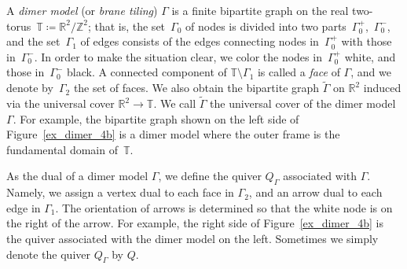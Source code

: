 \documentclass[11pt]{article}
\numberwithin{equation}{section}
\numberwithin{equation}{section}
\numberwithin{figure}{section}
\numberwithin{table}{section}
\newcommand{\ZZ}{\mathbb{Z}}
\newcommand{\RR}{\mathbb{R}}
\newcommand{\TT}{\mathbb{T}}
\begin{document}
A \emph{dimer model} (or \emph{brane tiling}) $\Gamma$ is a finite bipartite graph on the real two-torus~$\TT\coloneqq\RR^2/\ZZ^2$; that is, the set~$\Gamma_0$ of nodes is divided into two parts~$\Gamma_0^+$,~$\Gamma_0^-$, and the set~$\Gamma_1$ of edges consists of the edges connecting nodes in~$\Gamma_0^+$ with those in~$\Gamma_0^-$.
In order to make the situation clear, we color the nodes in~$\Gamma_0^+$ white, and those in~$\Gamma_0^-$ black.
A connected component of $\TT{\setminus}\Gamma_1$ is called a \emph{face} of $\Gamma$, and we denote by~$\Gamma_2$ the set of faces.
We also obtain the bipartite graph $\widetilde{\Gamma}$ on $\RR^2$ induced via the universal cover $\RR^2\rightarrow\TT$.
We call $\widetilde{\Gamma}$ the universal cover of the dimer model~$\Gamma$.
For example, the bipartite graph shown on the left side of Figure~\ref{ex_dimer_4b} is a dimer model
where the outer frame is the fundamental domain of~$\TT$.

As the dual of a dimer model $\Gamma$, we define the quiver $Q_\Gamma$ associated with $\Gamma$.
Namely, we assign a vertex dual to each face in $\Gamma_2$, and an arrow dual to each edge in $\Gamma_1$.
The orientation of arrows is determined so that the white node is on the right of the arrow.
For example, the right side of Figure~\ref{ex_dimer_4b} is the quiver associated with the dimer model on the left.
Sometimes we simply denote the quiver $Q_\Gamma$ by $Q$.

\newcommand{\basicdimerB}{
\coordinate (W1) at (5,1); \coordinate (W2) at (1,3); \coordinate (W3) at (3,5);
\coordinate (B1) at (3,1); \coordinate (B2) at (1,5); \coordinate (B3) at (5,3);
\draw[line width=\edgewidth] (0,0) rectangle (6,6);
\draw[line width=\edgewidth] (W2)--(B1)--(W1)--(B3)--(W3)--(B2)--(W2); \draw[line width=\edgewidth] (B1)--(W3);
\draw[line width=\edgewidth] (0,3)--(W2); \draw[line width=\edgewidth] (3,0)--(B1); \draw[line width=\edgewidth] (6,0)--(W1);
\draw[line width=\edgewidth] (6,3)--(B3); \draw[line width=\edgewidth] (3,6)--(W3); \draw[line width=\edgewidth] (0,6)--(B2);
\draw [line width=\nodewidth, fill=black] (B1) circle [radius=\noderad] ;
\draw [line width=\nodewidth, fill=black] (B2) circle [radius=\noderad] ;
\draw [line width=\nodewidth, fill=black] (B3) circle [radius=\noderad] ;
\draw [line width=\nodewidth, fill=white] (W1) circle [radius=\noderad] ;
\draw [line width=\nodewidth, fill=white] (W2) circle [radius=\noderad] ;
\draw [line width=\nodewidth, fill=white] (W3) circle [radius=\noderad] ;
}
\end{document}

